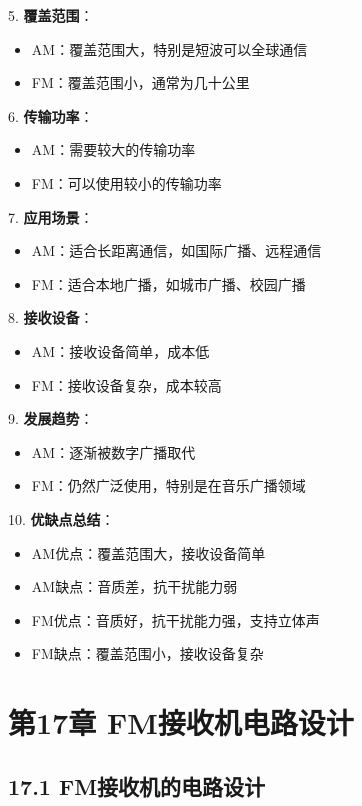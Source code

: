 \documentclass[12pt,UTF8]{ctexbook}
\begin{document}
5. \textbf{覆盖范围}：
   \begin{itemize}[leftmargin=3.5em]
   \item AM：覆盖范围大，特别是短波可以全球通信
   \item FM：覆盖范围小，通常为几十公里
   \end{itemize}

6. \textbf{传输功率}：
   \begin{itemize}[leftmargin=3.5em]
   \item AM：需要较大的传输功率
   \item FM：可以使用较小的传输功率
   \end{itemize}

7. \textbf{应用场景}：
   \begin{itemize}[leftmargin=3.5em]
   \item AM：适合长距离通信，如国际广播、远程通信
   \item FM：适合本地广播，如城市广播、校园广播
   \end{itemize}

8. \textbf{接收设备}：
   \begin{itemize}[leftmargin=3.5em]
   \item AM：接收设备简单，成本低
   \item FM：接收设备复杂，成本较高
   \end{itemize}

9. \textbf{发展趋势}：
   \begin{itemize}[leftmargin=3.5em]
   \item AM：逐渐被数字广播取代
   \item FM：仍然广泛使用，特别是在音乐广播领域
   \end{itemize}

10. \textbf{优缺点总结}：
    \begin{itemize}[leftmargin=3.5em]
    \item AM优点：覆盖范围大，接收设备简单
    \item AM缺点：音质差，抗干扰能力弱
    \item FM优点：音质好，抗干扰能力强，支持立体声
    \item FM缺点：覆盖范围小，接收设备复杂
    \end{itemize}

\chapter*{第17章 FM接收机电路设计}
\section*{17.1 FM接收机的电路设计}
\end{document}
